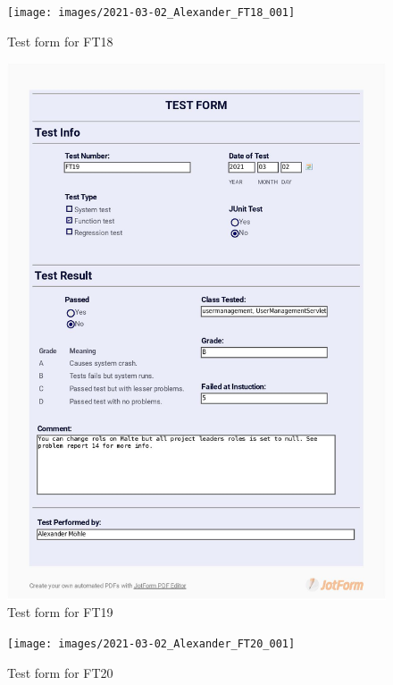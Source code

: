 \documentclass{article}
\begin{document}
 \begin{figure}
     \centering
     \texttt{[image: images/2021-03-02\_Alexander\_FT18\_001]}
     \renewcommand\figurename{Figure}
     \caption{Test form for FT18}
     \label{fig:my_label}
 \end{figure}
 
 \begin{figure}
     \centering
     \includegraphics[trim={1cm 3cm 1cm 1.5cm}, clip,width=13cm]{images/2021-03-02_Alexander_FT19_001}
     \renewcommand\figurename{Figure}
     \caption{Test form for FT19}
     \label{fig:my_label}
 \end{figure}
 
 \begin{figure}
     \centering
     \texttt{[image: images/2021-03-02\_Alexander\_FT20\_001]}
     \renewcommand\figurename{Figure}
     \caption{Test form for FT20}
     \label{fig:my_label}
 \end{figure}
 
\end{document}
